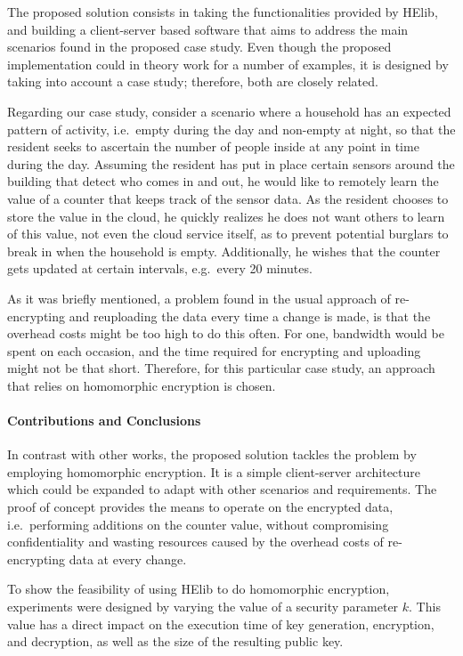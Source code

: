 The proposed solution consists in taking the functionalities provided by HElib, and building a client-server based software that aims to address the main scenarios found in the proposed case study. Even though the proposed implementation could in theory work for a number of examples, it is designed by taking into account a case study; therefore, both are closely related.

Regarding our case study, consider a scenario where a household has an expected pattern of activity, i.e.\ empty during the day and non-empty at night, so that the resident seeks to ascertain the number of people inside at any point in time during the day. Assuming the resident has put in place certain sensors around the building that detect who comes in and out, he would like to remotely learn the value of a counter that keeps track of the sensor data. As the resident chooses to store the value in the cloud, he quickly realizes he does not want others to learn of this value, not even the cloud service itself, as to prevent potential burglars to break in when the household is empty. Additionally, he wishes that the counter gets updated at certain intervals, e.g.\ every 20 minutes. 

As it was briefly mentioned, a problem found in the usual approach of re-encrypting and reuploading the data every time a change is made, is that the overhead costs might be too high to do this often. For one, bandwidth would be spent on each occasion, and the time required for encrypting and uploading might not be that short. Therefore, for this particular case study, an approach that relies on homomorphic encryption is chosen.

\paragraph{Contributions and Conclusions}
In contrast with other works, the proposed solution tackles the problem by employing homomorphic encryption. It is a simple client-server architecture which could be expanded to adapt with other scenarios and requirements. The proof of concept provides the means to operate on the encrypted data, i.e.\ performing additions on the counter value, without compromising confidentiality and wasting resources caused by the overhead costs of re-encrypting data at every change.

To show the feasibility of using HElib to do homomorphic encryption, experiments were designed by varying the value of a security parameter $k$. This value has a direct impact on the execution time of key generation, encryption, and decryption, as well as the size of the resulting public key.

